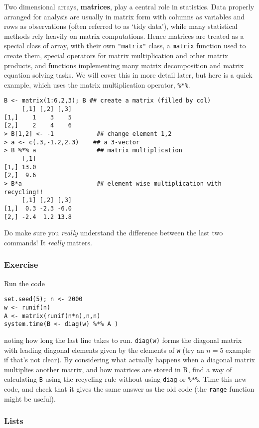 \documentclass[10pt] {article}
\theoremstyle{definition}
\begin{document}
Two dimensional arrays, {\bf matrices}, play a central role in statistics. Data properly arranged for analysis are usually in matrix form with columns as variables and rows as observations (often referred to as `tidy data'), while many statistical methods rely heavily on matrix computations. Hence matrices are treated as a special class of array, with their own \lstinline+"matrix"+ class, a {\tt matrix} function used to create them, special operators for matrix multiplication and other matrix products, and functions implementing many matrix decomposition and matrix equation solving tasks. We will cover this in more detail later, but here is a quick example, which uses the matrix multiplication operator, \lstinline+%*%+.
\begin{verbatim}
B <- matrix(1:6,2,3); B ## create a matrix (filled by col)
     [,1] [,2] [,3]
[1,]    1    3    5
[2,]    2    4    6
> B[1,2] <- -1            ## change element 1,2
> a <- c(.3,-1.2,2.3)    ## a 3-vector
> B %*% a                 ## matrix multiplication
     [,1]
[1,] 13.0
[2,]  9.6
> B*a                     ## element wise multiplication with recycling!!
     [,1] [,2] [,3]
[1,]  0.3 -2.3 -6.0
[2,] -2.4  1.2 13.8
\end{verbatim}   
Do make sure you {\em really} understand the difference between the last two commands! It {\em really} matters.

\subsubsection*{Exercise}

Run the code 
\begin{lstlisting}
set.seed(5); n <- 2000
w <- runif(n)
A <- matrix(runif(n*n),n,n)
system.time(B <- diag(w) %*% A )
\end{lstlisting}
noting how long the last line takes to run. \lstinline+diag(w)+ forms the diagonal matrix with leading diagonal elements given by the elements of {\tt w} (try an $n=5$ example if that's not clear). By considering what actually happens when a diagonal matrix multiplies another matrix, and how matrices are stored in R, find a way of calculating {\tt B} using the recycling rule without using {\tt diag} or \lstinline+%*%+. Time this new code, and check that it gives the same answer as the old code (the {\tt range} function might be useful).


\subsubsection{Lists}
\end{document}
